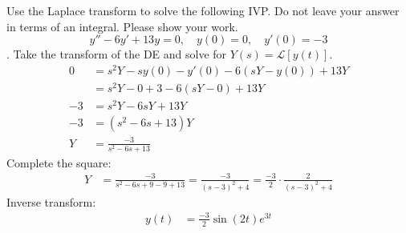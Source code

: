 \ifnum {}
\newpage 
\fi
\ifnum {}    
    \question[6] Use the Laplace transform to solve the following IVP. Do not leave your answer in terms of an integral. Please show your work.
    $$ y'' -6y'+13y = 0, \quad y(0) = 0, \quad y'(0) = -3$$. %
\ifnum {} {\color{DarkBlue} 
Take the transform of the DE and solve for $Y(s) = \mathcal{L}[y(t)]$.
\begin{align}
    0
    &= s^2Y-sy(0) - y'(0) - 6(sY-y(0)) + 13Y \\
    &= s^2Y-0 +3 - 6(sY-0) + 13Y \\
    -3 &= s^2Y - 6sY + 13Y \\
    -3 &= (s^2 - 6s + 13)Y \\
    Y &= \frac{-3}{s^2- 6s+13} 
\end{align}    
Complete the square:
\begin{align}
    Y &= \frac{-3}{s^2- 6s+9-9+13} = \frac{-3}{ (s-3)^2+4}=\frac{-3}{2}\cdot \frac{2}{ (s-3)^2+4}
\end{align}    
Inverse transform:
\begin{align}
    y(t) &= \frac{-3}{2}\sin(2t)e^{3t}
\end{align}
} 
\else 
\vspace{3cm}
\fi
\fi 



